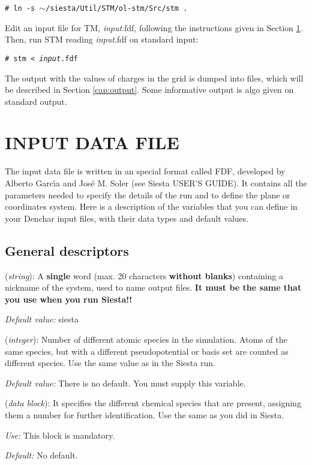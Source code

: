  {\tt \# ln -s $\sim$/siesta/Util/STM/ol-stm/Src/stm . }

 Edit an input file for {\sc TM}, {\it input}.fdf, following the 
 instructions given in Section \ref{cap:input}. Then,
 run  {\sc STM} reading {\it input}.fdf on
 standard input:


 {\tt \# stm < {\it input}.fdf } 


 The output with the values of charges 
 in the grid is dumped into files, which will be described
 in Section \ref{cap:output}. Some informative output is
 algo given on standard output.

\section{INPUT DATA FILE}
\label{cap:input} 

The input data file is written in an special format called FDF, developed
by Alberto Garc\'{\i}a and Jos\'e M. Soler (see {\sc Siesta} USER'S GUIDE).
It contains all the parameters needed to specify the details
of the run and to define the plane or coordinates system.
Here is a description of the variables that you can define in your 
{\sc Denchar} input files,
with their data types and default values.

\vspace{5pt}
\subsection{General descriptors}

\begin{description}
\itemsep 10pt
\parsep 0pt

\item[{\bf SystemLabel}] ({\it string}): 
A {\bf single} word (max. 20 characters {\bf without blanks})
containing a nickname of the system, used to name output files. 
{\bf It must be the same that you use when you run {\sc Siesta}!!}

{\it Default value:} siesta

\item[{\bf NumberOfSpecies}] ({\it integer}):
Number of different atomic species in the simulation.
Atoms of the same species, but with a different
pseudopotential or basis set are counted as different species.
Use the same value as in the {\sc Siesta} run.

{\it Default value:} There is no default. You must supply this variable.


\item[{\bf ChemicalSpeciesLabel}] ({\it data block}):
It specifies the different chemical species that are present,
assigning them a number for further identification.
Use the same as you did in {\sc Siesta}.

{\it Use:} This block is mandatory.

{\it Default:} No default.
\end{description}


